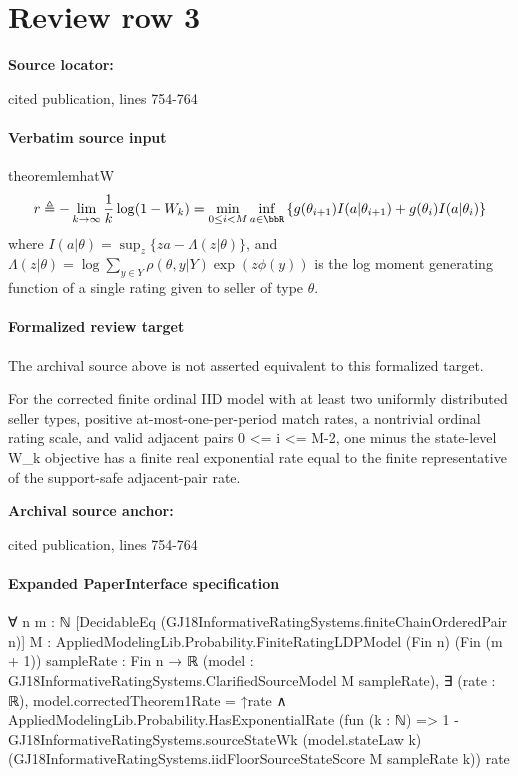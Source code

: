 \documentclass[10pt]{article}
\begin{document}
\section*{Review row 3}
\textbf{Source locator:} {\footnotesize\raggedright cited publication, lines 754-\allowbreak{}764\par}
\paragraph{Verbatim source input}
\begin{ReviewVerbatim}
\begin{restatable}{theorem}{lemhatW}
	\label{lem:hatW}
	\begin{equation}
	\label{eq:rW}
	r \triangleq - \lim_{k \to \infty} \frac{1}{k} \log (1- {W}_k) = \min_{0 \leq i < M} \inf_{a \in \bbR} \left \{ g(\theta_{i+1}) I(a|\theta_{i+1}) + g(\theta_i) I(a|\theta_i)\right\}
	\end{equation}
	where
	$I(a|\theta) = \sup_z \{ za - \Lambda(z|\theta) \}$, and $\Lambda(z|\theta) = \log \sum_{y \in Y} {\rho(\theta, y | Y)} \exp( z \phi(y))$ is the log moment generating function of a single rating given to seller of type $\theta$.
%
%
\end{restatable}
\end{ReviewVerbatim}


\paragraph{Formalized review target}
The archival source above is not asserted equivalent to this formalized target.
\begin{ReviewVerbatim}
For the corrected finite ordinal IID model with at least two uniformly distributed seller types, positive at-most-one-per-period match rates, a nontrivial ordinal rating scale, and valid adjacent pairs 0 <= i <= M-2, one minus the state-level W_k objective has a finite real exponential rate equal to the finite representative of the support-safe adjacent-pair rate.
\end{ReviewVerbatim}

\textbf{Archival source anchor:} {\footnotesize\raggedright cited publication, lines 754-\allowbreak{}764\par}
\paragraph{Expanded PaperInterface specification}
\begin{ReviewVerbatim}
∀ {n m : ℕ} [DecidableEq (GJ18InformativeRatingSystems.finiteChainOrderedPair n)]
  {M : AppliedModelingLib.Probability.FiniteRatingLDPModel (Fin n) (Fin (m + 1))} {sampleRate : Fin n → ℝ}
  (model : GJ18InformativeRatingSystems.ClarifiedSourceModel M sampleRate),
  ∃ (rate : ℝ),
    model.correctedTheorem1Rate = ↑rate ∧
      AppliedModelingLib.Probability.HasExponentialRate
        (fun (k : ℕ) =>
          1 -
            GJ18InformativeRatingSystems.sourceStateWk (model.stateLaw k)
              (GJ18InformativeRatingSystems.iidFloorSourceStateScore M sampleRate k))
        rate
\end{ReviewVerbatim}
\end{document}
